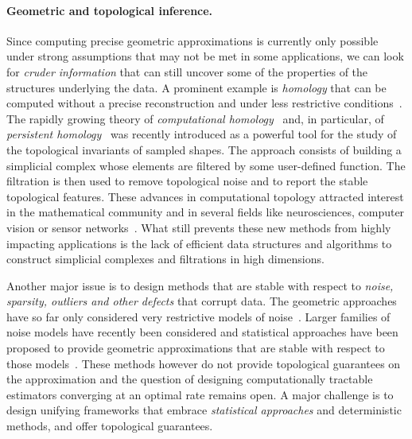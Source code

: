 \paragraph{Geometric and topological inference.}
Since computing precise geometric approximations is currently only possible under strong assumptions that may not be met in some applications, we can look for {\em cruder information }
that can still  uncover some of the properties of the structures underlying the data.
%
%
A prominent example is {\em homology} that can be computed without a precise reconstruction and under less restrictive conditions~\cite{geometrica-ccl09,nsw-fhm-2008}. The rapidly growing theory of {\em computational homology}~\cite{kmm-ch-2003} and, in particular, of {\em persistent homology}~\cite{eh-ph-2008,rg-bptd-2008,az-tfc-2009} was recently introduced as a powerful tool for the study of the topological invariants of sampled shapes. The approach consists of building a simplicial complex whose elements are filtered by some user-defined function. The filtration is then used to remove topological noise and to report the stable topological features.  These advances in computational topology attracted interest in the mathematical community and in several fields like neurosciences, computer vision or sensor networks~\cite{fpgo-airc-2009,cids-lbsni-2008,dsrg-csnph-2007}.  What still prevents these new methods from highly impacting applications is the lack of efficient data structures and algorithms to construct simplicial complexes and filtrations in high dimensions.

Another major issue is to design methods that are stable with respect
to {\em noise, sparsity, outliers and other defects} that corrupt data. The geometric approaches have so far only considered very restrictive models of noise~\cite{nsw-fhm-2008}.  Larger families of noise models have recently been considered and statistical approaches have been proposed to provide geometric approximations that are stable with respect to those models~\cite{gpvw-mme-2011}. These methods however do not provide topological guarantees on the approximation and the question of designing computationally tractable estimators converging at an optimal rate remains open. A major challenge is to design unifying frameworks that embrace {\em statistical approaches} and deterministic methods, and offer topological guarantees.  


